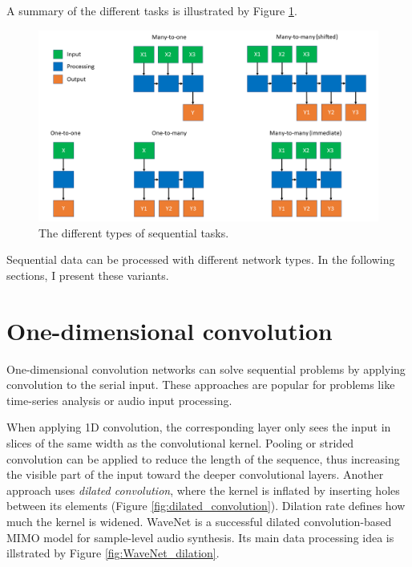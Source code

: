 A summary of the different tasks is illustrated by Figure \ref{fig:task_types}.

\begin{figure}[htb]
 \centerline{\includegraphics[width=1.0\columnwidth]{.//Figure/Sequential/task_types.png}}
 \caption{The different types of sequential tasks.}
 \label{fig:task_types}
\end{figure}

Sequential data can be processed with different network types. In the following sections, I present these variants.

\section{One-dimensional convolution}

One-dimensional convolution networks can solve sequential problems by applying convolution to the serial input. These approaches are popular for problems like time-series analysis or audio input processing. 

When applying 1D convolution, the corresponding layer only sees the input in slices of the same width as the convolutional kernel. Pooling or strided convolution can be applied to reduce the length of the sequence, thus increasing the visible part of the input toward the deeper convolutional layers. Another approach uses \textit{dilated convolution}, where the kernel is inflated by inserting holes between its elements (Figure \ref{fig:dilated_convolution}). Dilation rate defines how much the kernel is widened. WaveNet\cite{WaveNet} is a successful dilated convolution-based MIMO model for sample-level audio synthesis. Its main data processing idea is illstrated by Figure \ref{fig:WaveNet_dilation}.

